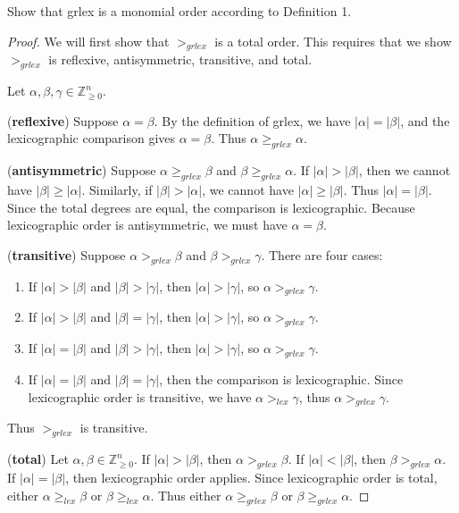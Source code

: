 \begin{tcolorbox}[title=Problem 4, breakable]
    Show that grlex is a monomial order according to Definition 1.
\end{tcolorbox}

\begin{proof}
    We will first show that $>_{grlex}$ is a total order.
    This requires that we show $>_{grlex}$ is reflexive, antisymmetric, transitive, and total.

    Let $\alpha, \beta, \gamma \in \mathbb{Z}_{\ge 0}^n$.

    (\textbf{reflexive})  
    Suppose $\alpha = \beta$.  
    By the definition of grlex, we have $|\alpha| = |\beta|$, and the lexicographic comparison gives $\alpha = \beta$.  
    Thus $\alpha \ge_{grlex} \alpha$.

    (\textbf{antisymmetric})  
    Suppose $\alpha \ge_{grlex} \beta$ and $\beta \ge_{grlex} \alpha$.  
    If $|\alpha| > |\beta|$, then we cannot have $|\beta| \ge |\alpha|$.  
    Similarly, if $|\beta| > |\alpha|$, we cannot have $|\alpha| \ge |\beta|$.  
    Thus $|\alpha| = |\beta|$.  
    Since the total degrees are equal, the comparison is lexicographic.  
    Because lexicographic order is antisymmetric, we must have $\alpha = \beta$.

    (\textbf{transitive})  
    Suppose $\alpha >_{grlex} \beta$ and $\beta >_{grlex} \gamma$.  
    There are four cases:
    \begin{enumerate}
        \item If $|\alpha| > |\beta|$ and $|\beta| > |\gamma|$, then  
        $|\alpha| > |\gamma|$, so $\alpha >_{grlex} \gamma$.
        \item If $|\alpha| > |\beta|$ and $|\beta| = |\gamma|$, then  
        $|\alpha| > |\gamma|$, so $\alpha >_{grlex} \gamma$.
        \item If $|\alpha| = |\beta|$ and $|\beta| > |\gamma|$, then  
        $|\alpha| > |\gamma|$, so $\alpha >_{grlex} \gamma$.
        \item If $|\alpha| = |\beta|$ and $|\beta| = |\gamma|$, then  
        the comparison is lexicographic.  
        Since lexicographic order is transitive, we have  
        $\alpha >_{lex} \gamma$, thus $\alpha >_{grlex} \gamma$.
    \end{enumerate}
    Thus $>_{grlex}$ is transitive.

    (\textbf{total})  
    Let $\alpha, \beta \in \mathbb{Z}_{\ge 0}^n$.  
    If $|\alpha| > |\beta|$, then $\alpha >_{grlex} \beta$.  
    If $|\alpha| < |\beta|$, then $\beta >_{grlex} \alpha$.  
    If $|\alpha| = |\beta|$, then lexicographic order applies.  
    Since lexicographic order is total, either $\alpha \ge_{lex} \beta$ or $\beta \ge_{lex} \alpha$.  
    Thus either $\alpha \ge_{grlex} \beta$ or $\beta \ge_{grlex} \alpha$.


\end{proof}
